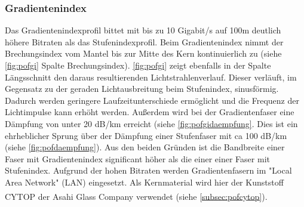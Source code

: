 \subsubsection{Gradientenindex}

Das Gradientenindexprofil bittet mit bis zu 10 Gigabit/s auf 100m deutlich
höhere Bitraten als das Stufenindexprofil. Beim Gradientenindex nimmt der
Brechungsindex vom Mantel bis zur Mitte des Kern kontinuierlich zu (siehe
\autoref{fig:pofgi} Spalte Brechungsindex). \autoref{fig:pofgi} zeigt ebenfalls
in der Spalte Längsschnitt den daraus resultierenden Lichtstrahlenverlauf.
Dieser verläuft, im Gegensatz zu der geraden Lichtausbreitung beim Stufenindex,
sinusförmig. Dadurch werden geringere Laufzeitunterschiede ermöglicht und die
Frequenz der Lichtimpulse kann erhöht werden. Außerdem wird bei der
Gradientenfaser eine Dämpfung von unter 20 dB/km erreicht (siehe
\autoref{fig:pofgidaempfung}. Dies ist ein ehrheblicher Sprung über der
Dämpfung einer Stufenfaser mit ca 100 dB/km (siehe \autoref{fig:pofdaempfung}).
Aus den beiden Gründen ist die Bandbreite einer Faser mit Gradientenindex
significant höher als die einer einer Faser mit Stufenindex. Aufgrund der hohen
Bitraten werden Gradientenfasern im "Local Area
Network" (LAN) eingesetzt. Als Kernmaterial wird hier der
Kunststoff CYTOP\textsuperscript{\textregistered} der Asahi Glass Company
verwendet (siehe \autoref{subsec:pofcytop}). \cite{pofacgif}

